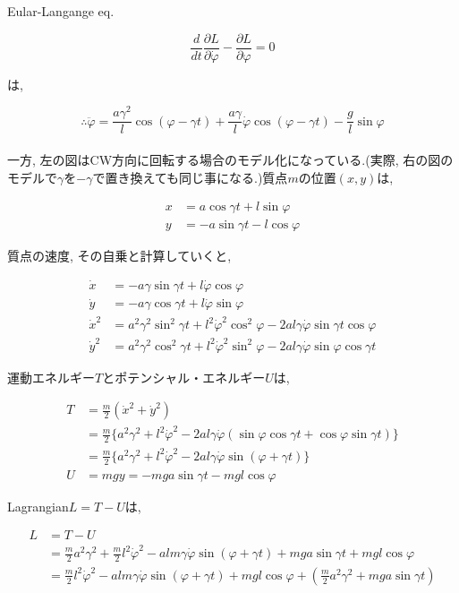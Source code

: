 Eular-Langange eq.

\[\displaystyle\frac{d}{dt}\frac{\partial L}{\partial\dot{\varphi}}-\frac{\partial L}{\partial\varphi}=0\]

は,

\[\therefore \ddot{\varphi}=\displaystyle\frac{a\gamma^2}{l}\cos(\varphi-\gamma t)+\frac{a\gamma}{l}\dot{\varphi}\cos(\varphi-\gamma t)-\frac{g}{l}\sin\varphi\]\\

一方, 左の図はCW方向に回転する場合のモデル化になっている.(実際, 右の図のモデルで$\gamma$を$-\gamma$で置き換えても同じ事になる.)質点$m$の位置$(x,y)$は,

\begin{align*}
   x&=a\cos\gamma t + l\sin\varphi\\
   y&=-a\sin\gamma t - l\cos\varphi
\end{align*}

質点の速度, その自乗と計算していくと,

\begin{align*}
   \dot{x}&=-a\gamma\sin\gamma t + l\dot{\varphi}\cos\varphi\\
   \dot{y}&=-a\gamma\cos\gamma t + l\dot{\varphi}\sin\varphi\\
   \dot{x}^2&=a^2\gamma^2\sin^2\gamma t + l^2\dot{\varphi}^2\cos^2\varphi - 2al\gamma\dot{\varphi}\sin\gamma t\cos\varphi\\
   \dot{y}^2&=a^2\gamma^2\cos^2\gamma t + l^2\dot{\varphi}^2\sin^2\varphi - 2al\gamma\dot{\varphi}\sin\varphi\cos\gamma t
\end{align*}

運動エネルギー$T$とポテンシャル・エネルギー$U$は,

\begin{align*}
   T&=\displaystyle\frac{m}{2}\left(\dot{x}^2+\dot{y}^2\right)\\
   &=\frac{m}{2}\{a^2\gamma^2 + l^2\dot{\varphi}^2 - 2al\gamma\dot{\varphi}\left(\sin\varphi\cos\gamma t + \cos\varphi\sin\gamma t\right)\}\\
   &=\frac{m}{2}\{a^2\gamma^2 + l^2\dot{\varphi}^2 - 2al\gamma\dot{\varphi}\sin(\varphi+\gamma t)\}\\
   U&=mgy= - mga\sin\gamma t - mgl\cos\varphi
\end{align*}

Lagrangian$L=T-U$は,

\begin{align*}
   L&=T-U\\&=\displaystyle\frac{m}{2}a^2\gamma^2 + \frac{m}{2}l^2\dot{\varphi}^2 - alm\gamma\dot{\varphi}\sin(\varphi+\gamma t) + mga\sin\gamma t + mgl\cos\varphi\\
   &=\frac{m}{2}l^2\dot{\varphi}^2 - alm\gamma\dot{\varphi}\sin(\varphi+\gamma t) + mgl\cos\varphi +\left(\frac{m}{2}a^2\gamma^2 + mga\sin\gamma t\right)
\end{align*}


